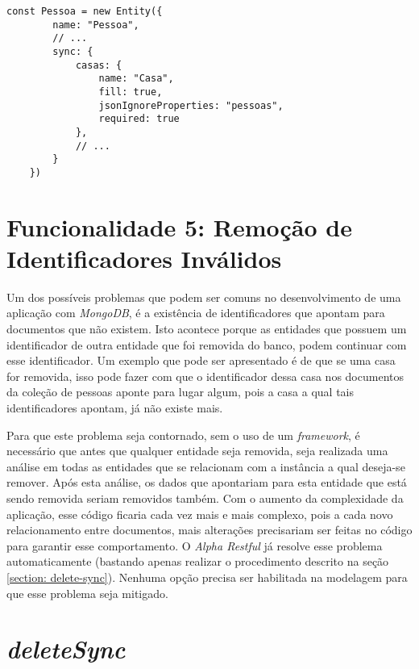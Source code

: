 \begin{lstlisting}[style=ES6, caption={Modelagem de Pessoa com \textit{required}\label{lst: required-alpha-restful}}]
    const Pessoa = new Entity({
        name: "Pessoa",
        // ...
        sync: {
            casas: {
                name: "Casa",
                fill: true,
                jsonIgnoreProperties: "pessoas",
                required: true
            },
            // ...
        }
    })
\end{lstlisting}

\section{Funcionalidade 5: Remoção de Identificadores Inválidos\label{section: identificadores-apontando-para-lixo}}

Um dos possíveis problemas que podem ser comuns no desenvolvimento de uma aplicação com \textit{MongoDB}, é a existência de identificadores que apontam para documentos que não existem. Isto acontece porque as entidades que possuem um identificador de outra entidade que foi removida do banco, podem continuar com esse identificador. Um exemplo que pode ser apresentado é de que se uma casa for removida, isso pode fazer com que o identificador dessa casa nos documentos da coleção de pessoas aponte para lugar algum, pois a casa a qual tais identificadores apontam, já não existe mais.
    
Para que este problema seja contornado, sem o uso de um \textit{framework}, é necessário que antes que qualquer entidade seja removida, seja realizada uma análise em todas as entidades que se relacionam com a instância a qual deseja-se remover. Após esta análise, os dados que apontariam para esta entidade que está sendo removida seriam removidos também. Com o aumento da complexidade da aplicação, esse código ficaria cada vez mais e mais complexo, pois a cada novo relacionamento entre documentos, mais alterações precisariam ser feitas no código para garantir esse comportamento. O \textit{Alpha Restful} já resolve esse problema automaticamente (bastando apenas realizar o procedimento descrito na seção \ref{section: delete-sync}). Nenhuma opção precisa ser habilitada na modelagem para que esse problema seja mitigado.

\section{\textit{deleteSync\label{section: delete-sync}}}

